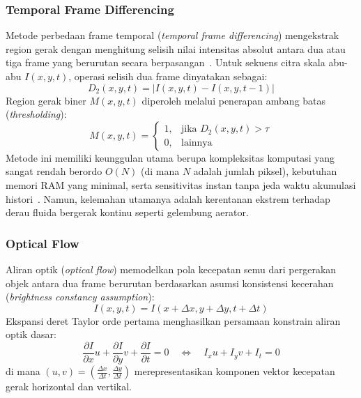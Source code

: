 \subsubsection{Temporal Frame Differencing}
Metode perbedaan frame temporal (\textit{temporal frame differencing}) mengekstrak region gerak dengan menghitung selisih nilai intensitas absolut antara dua atau tiga frame yang berurutan secara berpasangan~\cite{Dong2024}. Untuk sekuens citra skala abu-abu $I(x,y,t)$, operasi selisih dua frame dinyatakan sebagai:
\begin{equation}
    D_2(x,y,t) = |I(x,y,t) - I(x,y,t-1)|
    \label{eq:frame-diff-2}
\end{equation}
Region gerak biner $M(x,y,t)$ diperoleh melalui penerapan ambang batas (\textit{thresholding}):
\begin{equation}
    M(x,y,t) = \begin{cases} 
        1, & \text{jika } D_2(x,y,t) > \tau \\
        0, & \text{lainnya}
    \end{cases}
    \label{eq:binary-diff}
\end{equation}
Metode ini memiliki keunggulan utama berupa kompleksitas komputasi yang sangat rendah berordo $O(N)$ (di mana $N$ adalah jumlah piksel), kebutuhan memori RAM yang minimal, serta sensitivitas instan tanpa jeda waktu akumulasi histori~\cite{Liu2014}. Namun, kelemahan utamanya adalah kerentanan ekstrem terhadap derau fluida bergerak kontinu seperti gelembung aerator.

\subsubsection{Optical Flow}
Aliran optik (\textit{optical flow}) memodelkan pola kecepatan semu dari pergerakan objek antara dua frame berurutan berdasarkan asumsi konsistensi kecerahan (\textit{brightness constancy assumption}):
\begin{equation}
    I(x,y,t) = I(x + \Delta x, y + \Delta y, t + \Delta t)
    \label{eq:brightness-constancy}
\end{equation}
Ekspansi deret Taylor orde pertama menghasilkan persamaan konstrain aliran optik dasar:
\begin{equation}
    \frac{\partial I}{\partial x} u + \frac{\partial I}{\partial y} v + \frac{\partial I}{\partial t} = 0 \quad \iff \quad I_x u + I_y v + I_t = 0
    \label{eq:optical-flow-constraint}
\end{equation}
di mana $(u,v) = \left(\frac{\Delta x}{\Delta t}, \frac{\Delta y}{\Delta t}\right)$ merepresentasikan komponen vektor kecepatan gerak horizontal dan vertikal. 

